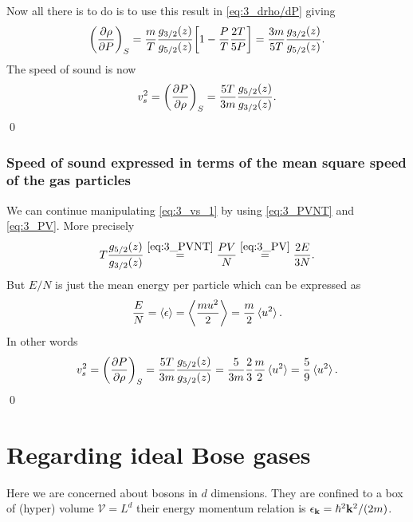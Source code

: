 \documentclass[11pt,letter, swedish, english
]{article}
\begin{document}
Now all there is to do is to use this result in \eqref{eq:3_drho/dP}
giving
\begin{equation}
\qty(\pdv{\rho}{P})_S
=\frac{m}{T}\frac{g_{3/2}(z)}{g_{5/2}(z)}
\qty[1-\frac{P}{T}\frac{2T}{5P}]
=\frac{3m}{5T}\frac{g_{3/2}(z)}{g_{5/2}(z)}.
\end{equation}
The speed of sound is now
\begin{equation}\label{eq:3_vs_1}
v_s^2=\qty(\pdv{P}{\rho})_S
=\frac{5T}{3m}\frac{g_{5/2}(z)}{g_{3/2}(z)}.
\end{equation}
\qed

\subsubsection*{Speed of sound expressed in terms of the mean square
  speed of the gas particles}
We can continue manipulating \eqref{eq:3_vs_1} by using
\eqref{eq:3_PVNT} and \eqref{eq:3_PV}. More precisely
\begin{equation}
T\frac{g_{5/2}(z)}{g_{3/2}(z)}\stackrel{\eqref{eq:3_PVNT}}{=}
\frac{PV}{N}\stackrel{\eqref{eq:3_PV}}{=}
\frac{2E}{3N}.
\end{equation}
But $E/N$ is just the mean energy per particle which can be expressed
as
\begin{equation}
\frac{E}{N}=\ev{\epsilon}=\ev{\frac{mu^2}{2}}
=\frac{m}{2}\ev*{u^2}.
\end{equation}
In other words
\begin{equation}
v_s^2=\qty(\pdv{P}{\rho})_S
=\frac{5T}{3m}\frac{g_{5/2}(z)}{g_{3/2}(z)}
=\frac{5}{3m}\frac{2}{3}\frac{m}{2}\ev*{u^2}
=\frac{5}{9}\ev*{u^2}.
\end{equation}
\qed

\section{Regarding ideal Bose gases }
\newcommand{\V}{\ensuremath{\mathcal{V}}}
\newcommand{\Sd}{\ensuremath{\mathcal{S}_d}}
\newcommand{\D}[1]{\ensuremath{\frac{d}{#1}}}
\newcommand{\nD}[1]{\ensuremath{\nicefrac{d}{#1}}}
\newcommand{\Tc}{\ensuremath{T_{\text{c}}}}

Here we are concerned about bosons in $d$ dimensions. They are
confined to a box of (hyper) volume $\V=L^d$ their energy momentum
relation is $\epsilon_{\vb{k}}=\hbar^2\vb{k}^2/(2m)$.
\end{document}
